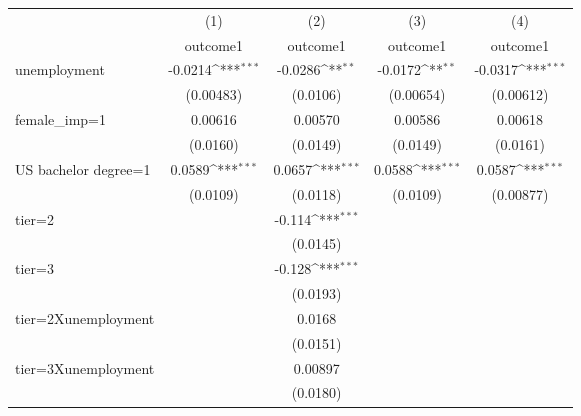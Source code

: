 {
\def\sym#1{\ifmmode^{#1}\else\(^{#1}\)\fi}
\begin{tabular}{l*{4}{c}}
\hline\hline
                    &\multicolumn{1}{c}{(1)}&\multicolumn{1}{c}{(2)}&\multicolumn{1}{c}{(3)}&\multicolumn{1}{c}{(4)}\\
                    &\multicolumn{1}{c}{outcome1}&\multicolumn{1}{c}{outcome1}&\multicolumn{1}{c}{outcome1}&\multicolumn{1}{c}{outcome1}\\
\hline
unemployment        &     -0.0214\sym{***}&     -0.0286\sym{**} &     -0.0172\sym{**} &     -0.0317\sym{***}\\
                    &   (0.00483)         &    (0.0106)         &   (0.00654)         &   (0.00612)         \\
[1em]
female\_imp=1        &     0.00616         &     0.00570         &     0.00586         &     0.00618         \\
                    &    (0.0160)         &    (0.0149)         &    (0.0149)         &    (0.0161)         \\
[1em]
US bachelor degree=1&      0.0589\sym{***}&      0.0657\sym{***}&      0.0588\sym{***}&      0.0587\sym{***}\\
                    &    (0.0109)         &    (0.0118)         &    (0.0109)         &   (0.00877)         \\
[1em]
tier=2              &                     &      -0.114\sym{***}&                     &                     \\
                    &                     &    (0.0145)         &                     &                     \\
[1em]
tier=3              &                     &      -0.128\sym{***}&                     &                     \\
                    &                     &    (0.0193)         &                     &                     \\
[1em]
tier=2Xunemployment &                     &      0.0168         &                     &                     \\
                    &                     &    (0.0151)         &                     &                     \\
[1em]
tier=3Xunemployment &                     &     0.00897         &                     &                     \\
                    &                     &    (0.0180)         &                     &                     \\

\end{tabular}}
